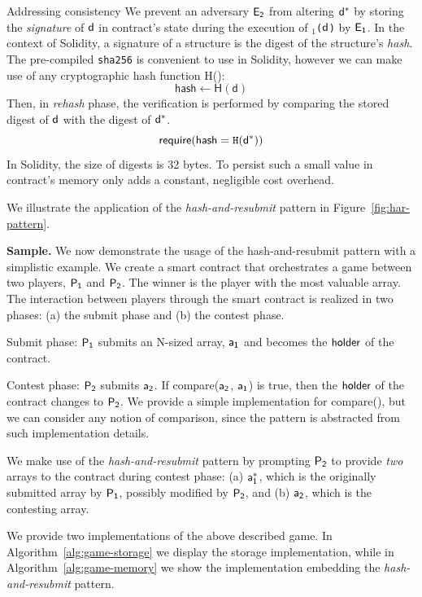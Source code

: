 \noindent \textsf{Addressing consistency} We prevent an adversary $\mathsf{E_{2}}$
from altering $\mathsf{d^*}$ by storing the \emph{signature} of $\mathsf{d}$ in contract's
state during the execution of \texttt{\proc$_1$($\mathsf{d}$)} by $\mathsf{E_{1}}$. In the
context of Solidity, a signature of a structure is the digest of the
structure's \emph{hash}. The pre-compiled \texttt{sha256} is convenient to use
in Solidity, however we can make use of any cryptographic hash function
\textsf{H()}: \[\textsf{hash} \gets \textsf{H}(\textsf{d})\] Then, in
\emph{rehash} phase, the verification is performed by comparing the stored
digest of $\mathsf{d}$ with the digest of $\mathsf{d^*}$.
\[\textsf{require}(\textsf{hash} = \texttt{H}(\mathsf{d^*}))\] \noindent In Solidity,
the size of digests is 32 bytes. To persist such a small value in contract's
memory only adds a constant, negligible cost overhead.

We illustrate the application of the \emph{hash-and-resubmit} pattern in
Figure~\ref{fig:har-pattern}.

\noindent \textbf{Sample.} We now demonstrate the usage of the
hash-and-resubmit pattern with a simplistic example. We create a smart contract
that orchestrates a game between two players, $\mathsf{P_1}$ and $\mathsf{P_2}$. The winner is
the player with the most valuable array. The interaction between players
through the smart contract is realized in two phases: (a) the submit phase and
(b) the contest phase.

\noindent \textsf{Submit phase:} $\mathsf{P_1}$ submits an N-sized array, $\mathsf{a_1}$ and
becomes the $\mathsf{holder}$ of the contract.

\noindent \textsf{Contest phase:} $\mathsf{P_2}$ submits $\mathsf{a_2}$. If
\textsf{compare}($\mathsf{a_2}$, $\mathsf{a_1}$) is true, then the $\mathsf{holder}$ of the contract
changes to $\mathsf{P_2}$. We provide a simple implementation for \textsf{compare()},
but we can consider any notion of comparison, since the pattern is abstracted
from such implementation details.

We make use of the \emph{hash-and-resubmit} pattern by prompting $\mathsf{P_2}$ to
provide \emph{two} arrays to the contract during contest phase: (a) $\mathsf{a_1^*}$,
which is the originally submitted array by $\mathsf{P_1}$, possibly modified by $\mathsf{P_2}$,
and (b) $\mathsf{a_2}$, which is the contesting array.

We provide two implementations of the above described game.
In Algorithm~\ref{alg:game-storage} we display the storage implementation,
while in Algorithm~\ref{alg:game-memory} we show the implementation
embedding the \emph{hash-and-resubmit} pattern.

